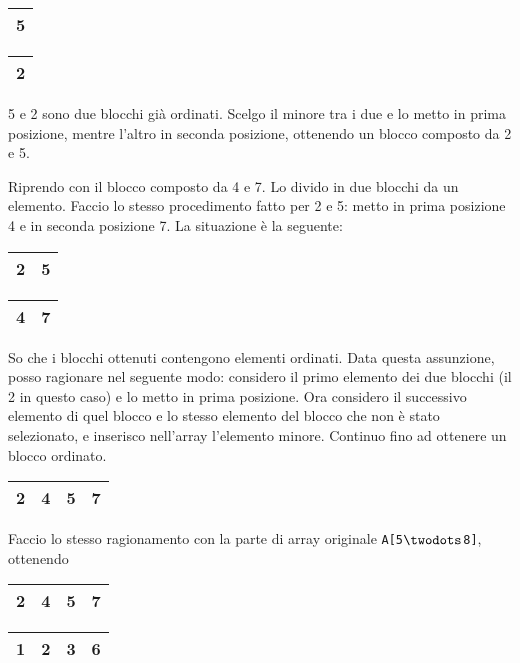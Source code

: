 \begin{center}
	\begin{tabular}{|l|}
		\hline
		5 \\
		\hline
	\end{tabular}
	\hspace{1cm}
	\begin{tabular}{|l|}
		\hline
		2 \\
		\hline
	\end{tabular}
\end{center}

5 e 2 sono due blocchi già ordinati. Scelgo il minore tra i due e lo metto in prima 
posizione, mentre l'altro in seconda posizione, ottenendo un blocco composto da 2 e 5.\par
Riprendo con il blocco composto da 4 e 7. Lo divido in due blocchi da un elemento. Faccio lo stesso procedimento 
fatto per 2 e 5: metto in prima posizione 4 e in seconda posizione 7. La situazione
è la seguente:

\begin{center}
	\begin{tabular}{|l|l|}
		\hline
		2 & 5 \\
		\hline
	\end{tabular}
	\hspace{1cm}
	\begin{tabular}{|l|l|}
		\hline
		4 & 7 \\
		\hline
	\end{tabular}
\end{center}

So che i blocchi ottenuti contengono elementi ordinati. Data questa assunzione, posso ragionare 
nel seguente modo: considero il primo elemento dei due blocchi (il 2 in questo caso) e lo metto 
in prima posizione. Ora considero il successivo elemento di quel blocco e lo stesso elemento del 
blocco che non è stato selezionato, e inserisco nell'array l'elemento minore. Continuo fino ad 
ottenere un blocco ordinato.

\begin{center}
	\begin{tabular}{|l|l|l|l|}
		\hline
		2 & 4 & 5 & 7 \\
		\hline
	\end{tabular}
\end{center}

Faccio lo stesso ragionamento con la parte di array originale \texttt{A[5$\twodots$8]}, ottenendo

\begin{center}
	\begin{tabular}{|l|l|l|l|}
		\hline
		2 & 4 & 5 & 7 \\
		\hline
	\end{tabular}
	\hspace{1cm}
	\begin{tabular}{|l|l|l|l|}
		\hline
		1 & 2 & 3 & 6 \\
		\hline
	\end{tabular}
\end{center}

